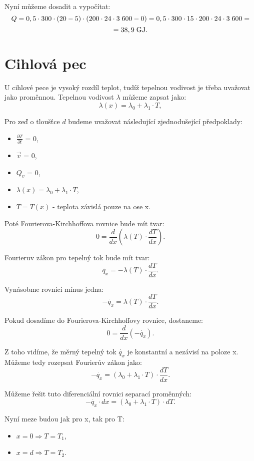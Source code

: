 \documentclass{article}
\begin{document}
Nyní můžeme dosadit a vypočítat:
$$
    Q = 0,5 \cdot 300 \cdot (20 - 5) \cdot (200 \cdot 24 \cdot 3 \; 600 - 0) = 0,5 \cdot 300 \cdot 15 \cdot 200 \cdot 24 \cdot 3 \; 600 =
$$
$$
    = 38,9 \; \textrm{GJ}.
$$

\newpage




\section{ Cihlová pec \spicy \spicy \spicy}
U cihlové pece je vysoký rozdíl teplot, tudíž tepelnou vodivost je třeba uvažovat jako proměnnou. Tepelnou vodivost $\lambda$ můžeme zapsat jako:
$$
    \lambda (x) = \lambda_0 + \lambda_1 \cdot T,
$$

Pro zeď o tloušťce $d$ budeme uvažovat následující zjednodušející předpoklady:
\begin{itemize}
    \item $\frac{\partial T}{\partial t}$ = 0,
    \item $\vec{v}$ = 0,
    \item $Q_v$ = 0,
    \item $\lambda (x) = \lambda_0 + \lambda_1 \cdot T$,
    \item $T = T(x)$ - teplota závislá pouze na ose x.
\end{itemize}

Poté Fourierova-Kirchhoffova rovnice bude mít tvar:
$$
    0 = \frac{d}{dx} \left ( \lambda (T) \cdot \frac{dT}{dx} \right ).
$$

Fourieruv zákon pro tepelný tok bude mít tvar:
$$
    \dot{q_x} = - \lambda (T) \cdot \frac{dT}{dx}.
$$

Vynásobme rovnici mínus jedna:
$$
    - \dot{q_x} = \lambda (T) \cdot \frac{dT}{dx}.
$$

Pokud dosadíme do Fourierova-Kirchhoffovy rovnice, dostaneme:
$$
    0 = \frac{d}{dx} \left ( - \dot{q_x} \right ).
$$

Z toho vidíme, že měrný tepelný tok $\dot{q_x}$ je konstantní a nezávisí na poloze x. Můžeme tedy rozepsat Fourierův zákon jako:
$$
    - \dot{q_x} = \left( \lambda_0 + \lambda_1 \cdot T \right) \cdot \frac{dT}{dx}.
$$

Můžeme řešit tuto diferenciální rovnici separací proměnných:
$$
    - \dot{q_x} \cdot dx = \left( \lambda_0 + \lambda_1 \cdot T \right) \cdot dT.
$$

Nyní meze budou jak pro x, tak pro T:
\begin{itemize}
    \item $x = 0 \Rightarrow T = T_1$,
    \item $x = d \Rightarrow T = T_2$.
\end{itemize}
\end{document}
